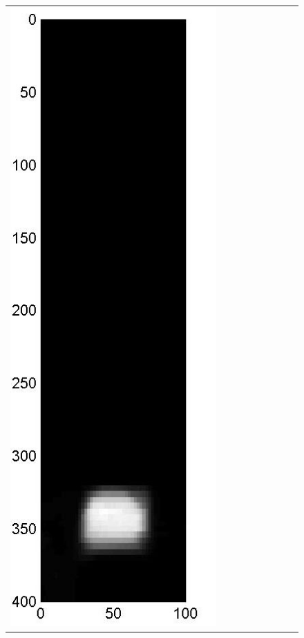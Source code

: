 \documentclass[11pt]{article}
\begin{document}
\begin{figure}[!h]
\begin{center}
\begin{tabular}{|c|c|c|c|c|c|c|c|c|}
			\includegraphics[width=.9\iwidth]{figures/newFigs/noisy/resultsExp-8-mkTV}
			&

\end{tabular}
\end{center}
\end{figure}
\end{document}
